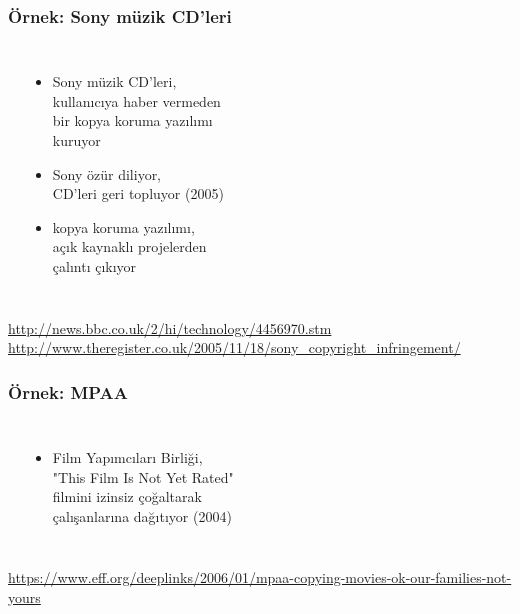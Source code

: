 \documentclass[dvipsnames]{beamer}
\theoremstyle{definition}
\theoremstyle{example}
\theoremstyle{plain}
\begin{document}
\begin{frame}
  \frametitle{Örnek: Sony müzik CD'leri}

  \begin{columns}
    \begin{center}
    \end{center}

    \begin{itemize}
      \item Sony müzik CD'leri,\\
        kullanıcıya haber vermeden\\
        bir kopya koruma yazılımı\\
        kuruyor
      \item Sony özür diliyor,\\
        CD'leri geri topluyor (2005)

      \pause
      \item kopya koruma yazılımı,\\
        açık kaynaklı projelerden\\
        çalıntı çıkıyor
    \end{itemize}
  \end{columns}

  \medskip
  \tiny{\url{http://news.bbc.co.uk/2/hi/technology/4456970.stm}}\\
  \tiny{\url{http://www.theregister.co.uk/2005/11/18/sony_copyright_infringement/}}\\
\end{frame}

\begin{frame}
  \frametitle{Örnek: MPAA}

  \begin{columns}
    \begin{center}
    \end{center}

    \begin{itemize}
      \item Film Yapımcıları Birliği,\\
        "This Film Is Not Yet Rated"\\
        filmini izinsiz çoğaltarak\\
        çalışanlarına dağıtıyor (2004)
    \end{itemize}
  \end{columns}

  \medskip
  \tiny{\url{https://www.eff.org/deeplinks/2006/01/mpaa-copying-movies-ok-our-families-not-yours}}\\
\end{frame}
\end{document}
